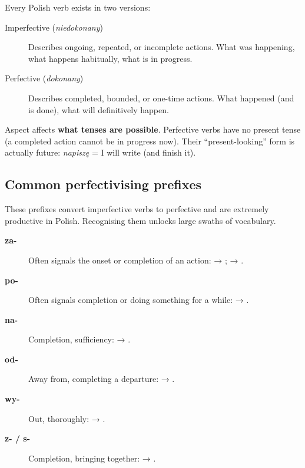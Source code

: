 Every Polish verb exists in two versions:

\begin{description}
  \item[Imperfective (\textit{niedokonany})] Describes ongoing, repeated, 
    or incomplete actions. What was happening, what happens habitually, 
    what is in progress.
  \item[Perfective (\textit{dokonany})] Describes completed, bounded, 
    or one-time actions. What happened (and is done), what will definitively happen.
\end{description}


Aspect affects \textbf{what tenses are possible}. Perfective verbs have 
no present tense (a completed action cannot be in progress now). Their 
``present-looking'' form is actually future: \textit{napiszę} = I will write (and finish it).

\subsection*{Common perfectivising prefixes}

These prefixes convert imperfective verbs to perfective and are extremely 
productive in Polish. Recognising them unlocks large swaths of vocabulary.

\begin{description}
  \item[\textbf{za-}] Often signals the onset or completion of an action: 
     → ; 
     → .
  \item[\textbf{po-}] Often signals completion or doing something for a while: 
     → .
  \item[\textbf{na-}] Completion, sufficiency: 
     → .
  \item[\textbf{od-}] Away from, completing a departure: 
     → .
  \item[\textbf{wy-}] Out, thoroughly: 
     → .
  \item[\textbf{z- / s-}] Completion, bringing together: 
     → .
\end{description}

